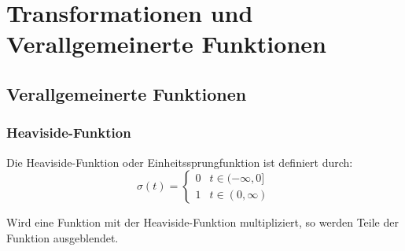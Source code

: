 \documentclass[12pt, a4paper, twoside]{scrreprt}
\begin{document}
\part{Transformationen und Verallgemeinerte Funktionen}

\chapter{Verallgemeinerte Funktionen}

\section{Heaviside-Funktion}
\begin{minipage}{.5\textwidth}
  Die Heaviside-Funktion oder Einheitssprungfunktion ist definiert durch:
  \[
    \sigma (t) =
    \begin{cases}
      0 & t \in (-\infty, 0]\\
    1 & t \in (0, \infty)
  \end{cases}
\]
\end{minipage}\hfill%
\begin{minipage}{.5\textwidth}
  \centering
\end{minipage}

\begin{minipage}{.5\textwidth}
  Wird eine Funktion mit der Heaviside-Funktion multipliziert, so werden Teile der Funktion ausgeblendet.
\end{minipage}\hfill%
\begin{minipage}{.5\textwidth}
  \centering
\end{minipage}
\end{document}
